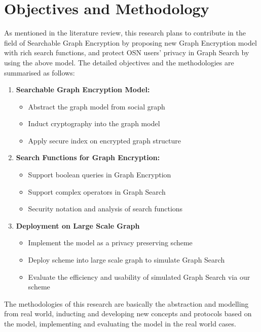 \chapter{Objectives and Methodology}
As mentioned in the literature review, this research plans to contribute in the field of Searchable Graph Encryption by proposing new  Graph Encryption model with rich search functions, and protect OSN users' privacy in Graph Search by using the above model. The detailed objectives and the methodologies are summarised as follows:
\begin{enumerate}
\setlength{\itemsep}{0pt}
\item {\bf Searchable Graph Encryption Model:}
\begin{itemize}
\setlength{\itemsep}{0pt}
\item Abstract the graph model from social graph
\item Induct cryptography into the graph model
\item Apply secure index on encrypted graph structure
\end{itemize}
\item{\bf Search Functions for Graph Encryption:}
\begin{itemize}
\setlength{\itemsep}{0pt}
\item Support boolean queries in Graph Encryption
\item Support complex operators in Graph Search
\item Security notation and analysis of search functions
\end{itemize}
\item{\bf Deployment on Large Scale Graph}
\begin{itemize}
\setlength{\itemsep}{0pt}
\item Implement the model as a privacy preserving scheme
\item Deploy scheme into large scale graph to simulate Graph Search
\item Evaluate the efficiency and usability of simulated Graph Search via our scheme
\end{itemize}
\end{enumerate}

The methodologies of this research are basically the abstraction and modelling from real world, inducting and developing new concepts and protocols based on the model, implementing and evaluating the model in the real world cases.